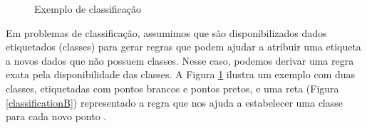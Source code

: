 \begin{figure}[!htb]
  \centering
  \caption{\label{classification} Exemplo de classificação}
  \qquad
  \vspace{1.5em}
\end{figure}

Em problemas de classificação, assumimos que são disponibilizados dados
etiquetados (classes) para gerar regras que podem ajudar a atribuir uma etiqueta
a novos dados que não possuem classes. Nesse caso, podemos derivar uma regra
exata pela disponibilidade das classes. A Figura \ref{classification} ilustra um
exemplo com duas classes, etiquetadas com pontos brancos e pontos pretos, e uma
reta (Figura \ref{classificationB}) representado a regra que nos ajuda a
estabelecer uma classe para cada novo ponto \cite{suthaharan2016machine}.

